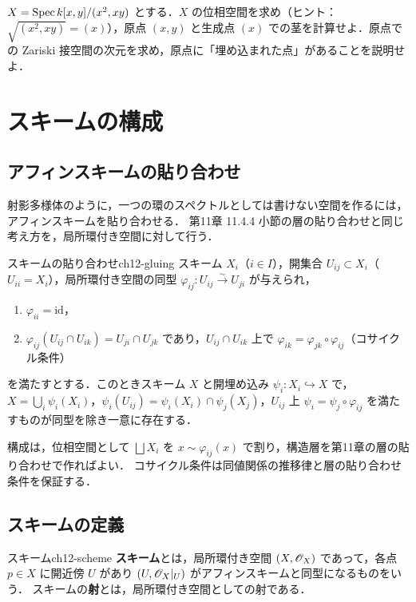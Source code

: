 $X=\operatorname{Spec} k[x,y]/(x^2,xy)$ とする．$X$ の位相空間を求め（ヒント：$\sqrt{(x^2,xy)}=(x)$），原点 $(x,y)$ と生成点 $(x)$ での茎を計算せよ．原点での Zariski 接空間の次元を求め，原点に「埋め込まれた点」があることを説明せよ．

\section{スキームの構成}

\subsection{アフィンスキームの貼り合わせ}

射影多様体のように，一つの環のスペクトルとしては書けない空間を作るには，アフィンスキームを貼り合わせる．
第11章 11.4.4 小節の層の貼り合わせと同じ考え方を，局所環付き空間に対して行う．

\begin{myprop}{スキームの貼り合わせ}{ch12-gluing}
スキーム $X_i$（$i\in I$），開集合 $U_{ij}\subset X_i$（$U_{ii}=X_i$），局所環付き空間の同型 $\varphi_{ij}\colon U_{ij}\xrightarrow{\sim}U_{ji}$ が与えられ，
\begin{enumerate}
  \item $\varphi_{ii}=\mathrm{id}$，
  \item $\varphi_{ij}(U_{ij}\cap U_{ik})=U_{ji}\cap U_{jk}$ であり，$U_{ij}\cap U_{ik}$ 上で $\varphi_{ik}=\varphi_{jk}\circ\varphi_{ij}$（コサイクル条件）
\end{enumerate}
を満たすとする．このときスキーム $X$ と開埋め込み $\psi_i\colon X_i\hookrightarrow X$ で，$X=\bigcup_i\psi_i(X_i)$，$\psi_i(U_{ij})=\psi_i(X_i)\cap\psi_j(X_j)$，$U_{ij}$ 上 $\psi_i=\psi_j\circ\varphi_{ij}$ を満たすものが同型を除き一意に存在する．
\end{myprop}

構成は，位相空間として $\bigsqcup X_i$ を $x\sim\varphi_{ij}(x)$ で割り，構造層を第11章の層の貼り合わせで作ればよい．
コサイクル条件は同値関係の推移律と層の貼り合わせ条件を保証する．

\subsection{スキームの定義}

\begin{mydef}{スキーム}{ch12-scheme}
\textbf{スキーム}とは，局所環付き空間 $(X,\mathscr{O}_X)$ であって，各点 $p\in X$ に開近傍 $U$ があり $(U,\mathscr{O}_X|_U)$ がアフィンスキームと同型になるものをいう．
スキームの\textbf{射}とは，局所環付き空間としての射である．
\end{mydef}

